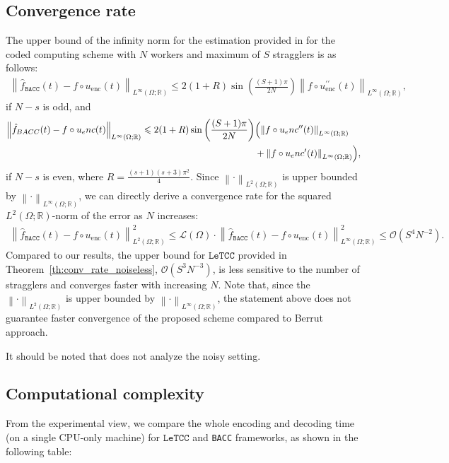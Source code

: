 \documentclass{article}
\def\encs{u_\textrm{enc}}
\def\nprcc{\texttt{LeTCC}}
\newcommand{\norm}[1]{\left\lVert#1\right\rVert}
\newcommand{\lp}[1]{{L}^{#1}\left(\Omega; \mathbb{R}\right)}
\begin{document}
\subsection{Convergence rate} \label{app:comp_berrut_conv_rate}
The upper bound of the infinity norm for the estimation provided in \citep{jahani2022berrut} for the coded computing scheme with $N$ workers and maximum of $S$ stragglers is as follows:
\begin{align}
\norm{\hat{f}_{\texttt{BACC}}(t)-f\circ\encs(t)}_{\lp{\infty}} \leqslant 2(1+R) \sin \left(\frac{(S+1) \pi}{2 N}\right)\norm{f\circ\encs^{\prime \prime}(t)}_{\lp{\infty}},
\end{align}
if $N-s$ is odd, and
\begin{align}
\norm{\hat{f}_{\texttt{BACC}}(t)-f\circ\encs(t)}_{\lp{\infty}} \leqslant 2(1+R) \sin \left(\frac{(S+1) \pi}{2 N}\right)&\Bigl(\norm{f\circ\encs^{\prime \prime}(t)}_{\lp{\infty}} \nonumber \\ &+\norm{f\circ\encs^{\prime}(t)}_{\lp{\infty}}\Bigr),
\end{align}
if $N-s$ is even, where $R=\frac{(s+1)(s+3) \pi^2}{4}$. Since $\norm{\cdot}_{\lp{2}}$ is upper bounded by $\norm{\cdot}_{\lp{\infty}}$, we can directly derive a convergence rate for the squared $\lp{2}$-norm of the error as $N$ increases:
\begin{align}
    \norm{\hat{f}_{\texttt{BACC}}(t)-f\circ\encs(t)}^2_{\lp{2}} \leqslant \mathcal{L}(\Omega) \cdot \norm{\hat{f}_{\texttt{BACC}}(t)-f\circ\encs(t)}^2_{\lp{\infty}} \leqslant \mathcal{O}(S^4N^{-2}).
\end{align}
Compared to our results, the upper bound for $\nprcc$ provided in Theorem~\ref{th:conv_rate_noiseless}, $\mathcal{O}(S^3N^{-3})$, is less sensitive to the number of stragglers and converges faster with increasing $N$.
Note that, since the $\norm{\cdot}_{\lp{2}}$ is upper bounded by $\norm{\cdot}_{\lp{\infty}}$, the statement above does not guarantee faster convergence of the proposed scheme compared to Berrut approach.

It should be noted that \citep{jahani2022berrut} does not analyze the noisy setting. 


\subsection{Computational complexity} \label{app:comp_berrut_complexity}
From the experimental view, we compare the whole encoding and decoding time (on a single CPU-only machine) for $\nprcc$ and \texttt{BACC} frameworks, as shown in the following table:
\end{document}
